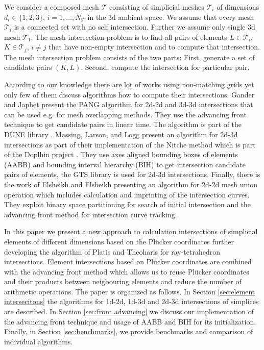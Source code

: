 \documentclass{elsarticle}
\newcommand{\plucker}{Pl\"{u}cker }
\begin{document}
We consider a composed mesh $\mathcal T$ consisting of simplicial meshes $\mathcal T_i$ of dimensions $d_i \in \{1,2,3\}$, $i=1,\dots,N_\mathcal{T}$
in the 3d ambient space. We assume that every mesh $\mathcal T_i$ is a connected set with no self intersection.
Further we assume only single 3d mesh $\mathcal{T}_1$.
The mesh intersection problem is to find all pairs of elements $L\in \mathcal{T}_i$, $K\in \mathcal{T}_j$, $i\ne j$ that have non-empty intersection 
and to compute that intersection. The mesh intersection problem consists of the two parts: First, generate a set of candidate pairs $(K, L)$. 
Second, compute the intersection for particular pair.

According to our knowledge there are lot of works using non-matching grids yet only few of them discuss algorithms how to compute their intersections. 
Gander and Japhet \cite{gander_algorithm_2013} present the PANG algorithm for 2d-2d and 3d-3d intersections that can be used e.g. for mesh overlapping methods.
They use the advancing front technique to get candidate pairs in linear time. The algorithm is part of the DUNE library \cite{bastian_towards_2005}.
Massing, Larson, and Logg \cite{massing_efficient_2013} present an algorithm for 2d-3d intersections as part of their implementation of the Nitche method 
which is part of the Doplhin project \cite{Dolphin}. They use axes aligned bounding boxes of elements (AABB) and bounding interval hierarchy (BIH) 
to get intersection candidate pairs of elements, the GTS library \cite{gtslib} is used for 2d-3d intersections. 
Finally, there is the work of Elsheikh and Elsheikh \cite{elsheikh_reliable_2012} presenting an algorithm for 2d-2d mesh union operation which includes 
calculation and imprinting of the intersection curves. They exploit binary space partitioning for search of initial intersection and 
the advancing front method for intersection curve tracking. 

In this paper we present a new approach to calculation intersections of simplicial elements of different dimensions based on the \plucker coordinates
further developing the algorithm of Platis and Theoharis \cite{platis_fast_2003} for ray-tetrahedron intersections. Element intersections based on 
\plucker coordinates are combined with the advancing front method which allows us to reuse \plucker coordinates and their products between neigbouring
elements and reduce the number of arithmetic operations. The paper is organized as follows. In Section \ref{sec:element intersecitons} the algorithms for
1d-2d, 1d-3d and 2d-3d intersections of simplices are described. In Section \ref{sec:front advancing} we discuss our implementation of the advancing front 
technique and usage of AABB and BIH for its initialization. Finally, in Section \ref{sec:benchmarks}, we provide benchmarks and comparison of individual algorithms.
\end{document}

